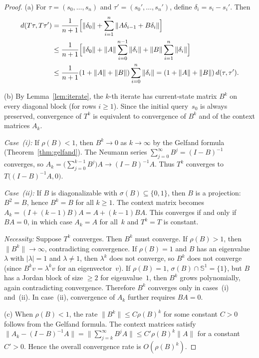 \begin{proof}
  (a) For $\tau=(s_0,\dots,s_n)$ and $\tau'=(s_0',\dots,s_n')$, define
  $\delta_i=s_i-s_i'$. Then
  \begin{align*}
    d(T\tau,T\tau')
    &= \frac{1}{n+1}\Bigl[\|\delta_0\|+\sum_{i=1}^{n}
      \|A\delta_{i-1}+B\delta_i\|\Bigr] \\
    &\leq \frac{1}{n+1}\Bigl[\|\delta_0\|+\|A\|\sum_{i=0}^{n-1}\|\delta_i\|
      +\|B\|\sum_{i=1}^{n}\|\delta_i\|\Bigr] \\
    &\leq \frac{1}{n+1}(1+\|A\|+\|B\|)\sum_{i=0}^{n}\|\delta_i\|
    = (1+\|A\|+\|B\|)\,d(\tau,\tau').
  \end{align*}

  (b) By Lemma~\ref{lem:iterate}, the $k$-th iterate has current-state matrix
  $B^k$ on every diagonal block (for rows $i\geq 1$). Since the initial
  query~$s_0$ is always preserved, convergence of $T^k$ is equivalent to
  convergence of $B^k$ and of the context matrices $A_k$.

  \emph{Case~(i):} If $\rho(B)<1$, then $B^k\to 0$ as $k\to\infty$ by the
  Gelfand formula (Theorem~\ref{thm:gelfand}). The Neumann series
  $\sum_{j=0}^{\infty}B^j=(I-B)^{-1}$ converges, so
  $A_k=\bigl(\sum_{j=0}^{k-1}B^j\bigr)A\to(I-B)^{-1}A$. Thus $T^k$
  converges to $T\bigl((I-B)^{-1}A,0\bigr)$.

  \emph{Case~(ii):} If $B$ is diagonalizable with
  $\sigma(B)\subseteq\{0,1\}$, then $B$ is a projection: $B^2=B$, hence
  $B^k=B$ for all $k\geq 1$. The context matrix becomes
  $A_k=(I+(k-1)B)A=A+(k-1)BA$. This converges if and only if $BA=0$, in which
  case $A_k=A$ for all~$k$ and $T^k=T$ is constant.

  \emph{Necessity:} Suppose $T^k$ converges. Then $B^k$ must converge.
  If $\rho(B)>1$, then $\|B^k\|\to\infty$, contradicting convergence.
  If $\rho(B)=1$ and $B$ has an eigenvalue $\lambda$ with $|\lambda|=1$ and
  $\lambda\neq 1$, then $\lambda^k$ does not converge, so $B^k$ does not
  converge (since $B^k v=\lambda^k v$ for an eigenvector~$v$). If
  $\rho(B)=1$, $\sigma(B)\cap\mathbb{S}^1=\{1\}$, but $B$ has a Jordan block
  of size $\geq 2$ for eigenvalue~$1$, then $B^k$ grows polynomially, again
  contradicting convergence. Therefore $B^k$ converges only in cases~(i)
  and~(ii). In case~(ii), convergence of $A_k$ further requires $BA=0$.

  (c) When $\rho(B)<1$, the rate $\|B^k\|\leq C\rho(B)^k$ for some constant
  $C>0$ follows from the Gelfand formula. The context matrices satisfy
  $\|A_k-(I-B)^{-1}A\|=\|\sum_{j=k}^{\infty}B^j A\|\leq
  C'\rho(B)^k\|A\|$ for a constant $C'>0$. Hence the overall convergence
  rate is $O(\rho(B)^k)$.
\end{proof}

